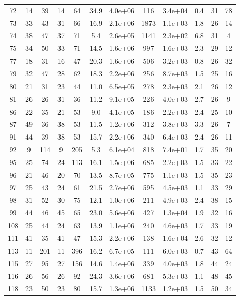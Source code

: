 \begin{table}
\begin{tabular}{cccccccccccc}
72 & 14 & 39 & 14 & 64 & 34.9 & 4.0e+06 & 116 & 3.4e+04 & 0.4 & 31 & 78 \\
73 & 33 & 43 & 31 & 66 & 16.9 & 2.1e+06 & 1873 & 1.1e+03 & 1.8 & 26 & 14 \\
74 & 38 & 47 & 37 & 71 & 5.4 & 2.6e+05 & 1141 & 2.3e+02 & 6.8 & 31 & 4 \\
75 & 34 & 50 & 33 & 71 & 14.5 & 1.6e+06 & 997 & 1.6e+03 & 2.3 & 29 & 12 \\
77 & 18 & 31 & 16 & 47 & 20.3 & 1.6e+06 & 506 & 3.2e+03 & 0.8 & 26 & 32 \\
79 & 32 & 47 & 28 & 62 & 18.3 & 2.2e+06 & 256 & 8.7e+03 & 1.5 & 25 & 16 \\
80 & 21 & 31 & 23 & 44 & 11.0 & 6.5e+05 & 278 & 2.3e+03 & 2.1 & 26 & 12 \\
81 & 26 & 26 & 31 & 36 & 11.2 & 9.1e+05 & 226 & 4.0e+03 & 2.7 & 26 & 9 \\
86 & 22 & 35 & 21 & 53 & 9.0 & 4.1e+05 & 186 & 2.2e+03 & 2.4 & 25 & 10 \\
87 & 49 & 36 & 38 & 53 & 11.5 & 1.2e+06 & 312 & 3.8e+03 & 3.3 & 26 & 7 \\
91 & 44 & 39 & 38 & 53 & 15.7 & 2.2e+06 & 340 & 6.4e+03 & 2.4 & 26 & 11 \\
92 & 9 & 114 & 9 & 205 & 5.3 & 6.1e+04 & 818 & 7.4e+01 & 1.7 & 35 & 20 \\
95 & 25 & 74 & 24 & 113 & 16.1 & 1.5e+06 & 685 & 2.2e+03 & 1.5 & 33 & 22 \\
96 & 21 & 46 & 20 & 70 & 13.5 & 8.7e+05 & 775 & 1.1e+03 & 1.5 & 35 & 23 \\
97 & 25 & 43 & 24 & 61 & 21.5 & 2.7e+06 & 595 & 4.5e+03 & 1.1 & 33 & 29 \\
98 & 31 & 52 & 30 & 75 & 12.1 & 1.0e+06 & 211 & 4.9e+03 & 2.4 & 38 & 15 \\
99 & 44 & 46 & 45 & 65 & 23.0 & 5.6e+06 & 427 & 1.3e+04 & 1.9 & 32 & 16 \\
108 & 25 & 44 & 24 & 63 & 13.9 & 1.1e+06 & 240 & 4.6e+03 & 1.7 & 33 & 19 \\
111 & 41 & 35 & 41 & 47 & 15.3 & 2.2e+06 & 138 & 1.6e+04 & 2.6 & 32 & 12 \\
113 & 11 & 201 & 11 & 396 & 16.2 & 6.7e+05 & 111 & 6.0e+03 & 0.7 & 43 & 64 \\
115 & 27 & 95 & 27 & 156 & 14.6 & 1.4e+06 & 339 & 4.0e+03 & 1.8 & 44 & 24 \\
116 & 26 & 56 & 26 & 92 & 24.3 & 3.6e+06 & 681 & 5.3e+03 & 1.1 & 48 & 45 \\
118 & 23 & 50 & 23 & 80 & 15.7 & 1.3e+06 & 1133 & 1.2e+03 & 1.5 & 50 & 34 \\

\end{tabular}
\end{table}
